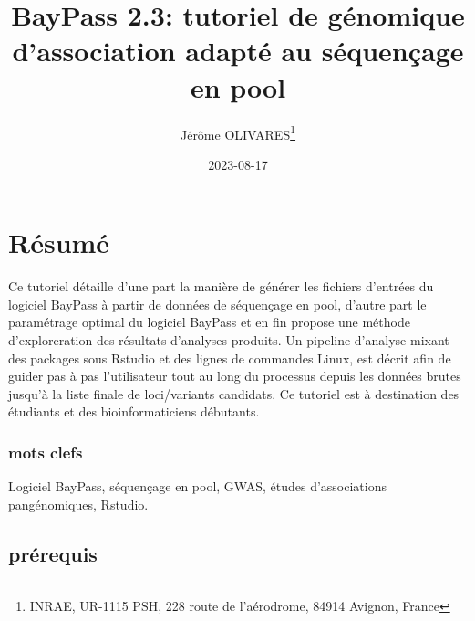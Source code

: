 \documentclass[
  openany]{book}
\title{BayPass 2.3: tutoriel de génomique d'association adapté au séquençage en pool}
\author{Jérôme OLIVARES\footnote{INRAE, UR-1115 PSH, 228 route de l'aérodrome, 84914 Avignon, France}}
\date{2023-08-17}
\theoremstyle{definition}
\theoremstyle{definition}
\theoremstyle{definition}
\theoremstyle{definition}
\theoremstyle{remark}
\begin{document}
\maketitle

{
\hypersetup{linkcolor=}
\setcounter{tocdepth}{1}
\tableofcontents
}
\hypertarget{ruxe9sumuxe9}{%
\chapter*{Résumé}\label{ruxe9sumuxe9}}

Ce tutoriel détaille d'une part la manière de générer les fichiers d'entrées du logiciel BayPass à partir de données de séquençage en pool, d'autre part le paramétrage optimal du logiciel BayPass et en fin propose une méthode d'exploreration des résultats d'analyses produits. Un pipeline d'analyse mixant des packages sous Rstudio et des lignes de commandes Linux, est décrit afin de guider pas à pas l'utilisateur tout au long du processus depuis les données brutes jusqu'à la liste finale de loci/variants candidats.
Ce tutoriel est à destination des étudiants et des bioinformaticiens débutants.

\hypertarget{mots-clefs}{%
\subsection*{mots clefs}\label{mots-clefs}}

Logiciel BayPass, séquençage en pool, GWAS, études d'associations pangénomiques, Rstudio.

\hypertarget{pruxe9requis}{%
\section*{prérequis}\label{pruxe9requis}}
\end{document}
